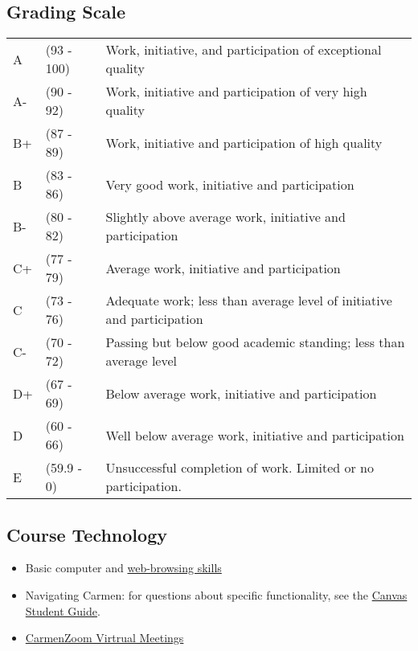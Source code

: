 \subsection{Grading Scale}

\begin{tabularx}{\textwidth}{@{}l @{}l X@{}}
      A \hspace*{1em} & (93 - 100) & Work, initiative, and participation of exceptional quality             \\
      A-              & (90 - 92)  & Work, initiative and participation of very high quality                \\
      B+              & (87 - 89)  & Work, initiative and participation of high quality                     \\
      B               & (83 - 86)  & Very good work, initiative and participation                           \\
      B-              & (80 - 82)  & Slightly above average work, initiative and participation              \\
      C+              & (77 - 79)  & Average work, initiative and participation                             \\
      C               & (73 - 76)  & Adequate work; less than average level of initiative and participation \\
      C-              & (70 - 72)  & Passing but below good academic standing; less than average level      \\
      D+              & (67 - 69)  & Below average work, initiative and participation                       \\
      D               & (60 - 66)  & Well below average work, initiative and participation                  \\
      E               & (59.9 - 0) & Unsuccessful completion of work. Limited or no participation.
\end{tabularx}


\subsection{Course Technology}

\begin{itemize}
      \tightlist
      \item Basic computer and \href{https://lmgtfy.com/}{web-browsing skills}
      \item Navigating Carmen: for questions about specific functionality, see the \href{https://community.canvaslms.com/docs/DOC-10701}{Canvas Student Guide}.
      \item \href{https://go.osu.edu/Bqdx}{CarmenZoom Virtrual Meetings}
\end{itemize}

